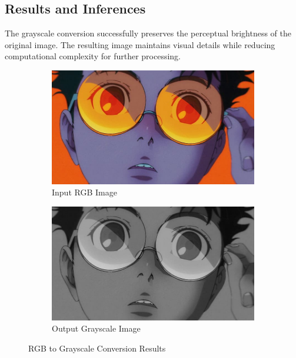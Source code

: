 \documentclass[12pt,a4paper]{article}
\begin{document}
\subsection{Results and Inferences}
The grayscale conversion successfully preserves the perceptual brightness of the original image. The resulting image maintains visual details while reducing computational complexity for further processing.

\begin{figure}[H]
  \centering
  \begin{subfigure}[b]{0.8\textwidth}
    \centering
    \includegraphics[width=\textwidth]{grayscale/grayscale_custom.png}
    \caption{Input RGB Image}
  \end{subfigure}
  \vspace{1em}
  \begin{subfigure}[b]{0.8\textwidth}
    \centering
    \includegraphics[width=\textwidth]{grayscale/grayscale_opencv.jpg}
    \caption{Output Grayscale Image}
  \end{subfigure}
  \caption{RGB to Grayscale Conversion Results}
  \label{fig:rgb_to_gray}
\end{figure}
\end{document}
